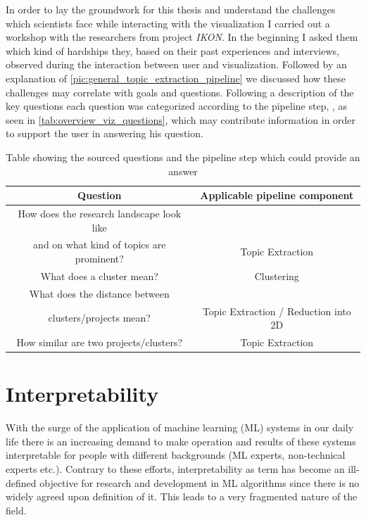 In order to lay the groundwork for this thesis and understand the challenges which scientists face while interacting with the visualization I carried out a workshop with the researchers from project \textit{IKON}. In the beginning I asked them which kind of hardships they, based on their past experiences and interviews, observed during the interaction between user and visualization. Followed by an explanation of \autoref{pic:general_topic_extraction_pipeline} we discussed how these challenges may correlate with goals and questions. Following a description of the key questions each question was categorized according to the pipeline step, , as seen in \autoref{tab:overview_viz_questions}, which may contribute information in order to support the user in answering his question.

\begin{table}
	\centering
	\begin{tabular}{ c | c }
		\hline 
		Question & Applicable pipeline component \\ \hline
		How does the research landscape look like \\ and on what kind of topics are prominent? & Topic Extraction \\ \hline
		What does a cluster mean? & Clustering \\ \hline
		What does the distance between \\ clusters/projects mean? & Topic Extraction / Reduction into 2D \\ \hline
		How similar are two projects/clusters? & Topic Extraction \\
		\hline
	\end{tabular}
	\caption{\label{tab:overview_viz_questions} Table showing the sourced questions and the pipeline step which could provide an answer}
\end{table} 

\section{Interpretability}

With the surge of the application of machine learning (ML) systems in our daily life there is an increasing demand to make operation and results of these systems interpretable for people with different backgrounds (ML experts, non-technical experts etc.). Contrary to these efforts, interpretability as term has become an ill-defined objective \cite{liptonMythosModelInterpretability2016a} for research and development in ML algorithms since there is no widely agreed upon definition of it. This leads to a very fragmented nature of the field. 

